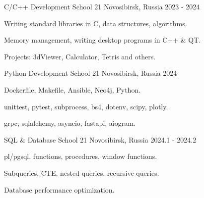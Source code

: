 \begin{cventries}
\end{cventries}



\begin{cventries}

  \cventry
    {C/C++ Development} %
    {School 21} %
    {Novosibirsk, Russia} %
    {2023 - 2024} %
    {
      \begin{cvitems} %
        \item {Writing standard libraries in C, data structures, algorithms.}
        \item {Memory management, writing desktop programs in C++ \& QT.}
        \item {Projects: 3dViewer, Calculator, Tetris and others.}
      \end{cvitems}
    }

  \cventry
    {Python Development} %
    {School 21} %
    {Novosibirsk, Russia} %
    {2024} %
    {
      \begin{cvitems} %
        \item {Dockerfile, Makefile, Ansible, Neo4j, Python.}
        \item {unittest, pytest, subprocess, bs4, dotenv, scipy, plotly.}
        \item {grpc, sqlalchemy, asyncio, fastapi, aiogram.}
      \end{cvitems}
    }

  \cventry
    {SQL \& Database} %
    {School 21} %
    {Novosibirsk, Russia} %
    {2024.1 - 2024.2} %
    {
      \begin{cvitems} %
        \item {pl/pgsql, functions, procedures, window functions.}
        \item {Subqueries, CTE, nested queries, recursive queries.}
        \item {Database performance optimization.}
      \end{cvitems}
    }


\end{cventries}

